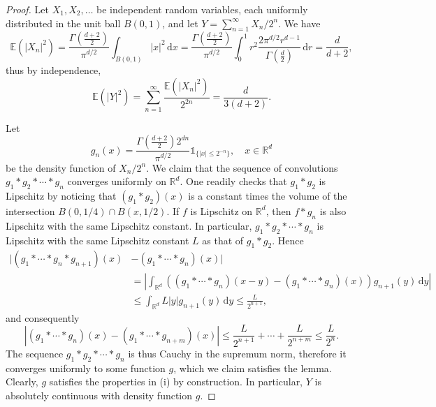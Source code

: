 \documentclass[11pt,a4paper]{article}
\theoremstyle{definition}
\begin{document}
\begin{proof} Let $X_1, X_2, \ldots$ be independent random variables, each uniformly distributed in the unit ball $B(0,1)$, and let $Y=\sum_{n=1}^{\infty} X_n/2^n$. We have
\[ \mathbb{E} (|X_n|^2) = \frac{\Gamma \left( \frac{d+2}{2} \right)}{\pi^{d/2}} \int_{B(0,1)} |x|^2 \, \mathrm{d}x = \frac{\Gamma \left( \frac{d+2}{2} \right)}{\pi^{d/2}} \int_0^1 r^2 \frac{2 \pi^{d/2} r^{d-1}}{\Gamma \left( \frac{d}{2} \right)} \, \mathrm{d}r = \frac{d}{d+2}, \]
thus by independence,
\begin{equation}\label{Yvariance}
\mathbb{E} (|Y|^2) = \sum_{n=1}^{\infty} \frac{\mathbb{E} (|X_n|^2)}{2^{2n}} = \frac{d}{3(d+2)} .
\end{equation}

Let
\[ g_n (x) = \frac{\Gamma \left( \frac{d+2}{2} \right) 2^{dn}}{\pi^{d/2}} \mathds{1}_{\{ |x| \le 2^{-n} \}}, \quad x \in \mathbb{R}^d \]
be the density function of $X_n/2^n$. We claim that the sequence of convolutions $g_1 * g_2 * \cdots * g_n$ converges uniformly on $\mathbb{R}^d$. One readily checks that $g_1*g_2$ is Lipschitz by noticing that $(g_1*g_2)(x)$ is a constant times the volume of the intersection $B(0,1/4) \cap B(x,1/2)$. If $f$ is Lipschitz on $\mathbb{R}^d$, then $f*g_n$ is also Lipschitz with the same Lipschitz constant. In particular, $g_1 * g_2 * \cdots *g_n$ is Lipschitz with the same Lipschitz constant $L$ as that of $g_1 * g_2$. Hence
\[ \begin{split}| (g_1 * \cdots * g_n * g_{n+1})(x) &- (g_1 * \cdots * g_n)(x)| \\ &= \left| \int_{\mathbb{R}^d} \left( (g_1 * \cdots * g_n)(x-y) - (g_1 * \cdots * g_n)(x) \right) g_{n+1}(y) \, \mathrm{d}y \right| \\ &\le \int_{\mathbb{R}^d} L |y| g_{n+1}(y) \, \mathrm{d}y \le \frac{L}{2^{n+1}} , \end{split} \]
and consequently
\[ |(g_1 * \cdots * g_n)(x) - (g_1 * \cdots * g_{n+m})(x)| \le \frac{L}{2^{n+1}} + \cdots + \frac{L}{2^{n+m}} \le \frac{L}{2^n} . \]
The sequence $g_1 * g_2 * \cdots *g_n$ is thus Cauchy in the supremum norm, therefore it converges uniformly to some function $g$, which we claim satisfies the lemma. Clearly, $g$ satisfies the properties in (i) by construction. In particular, $Y$ is absolutely continuous with density function $g$.


\end{proof}
\end{document}
